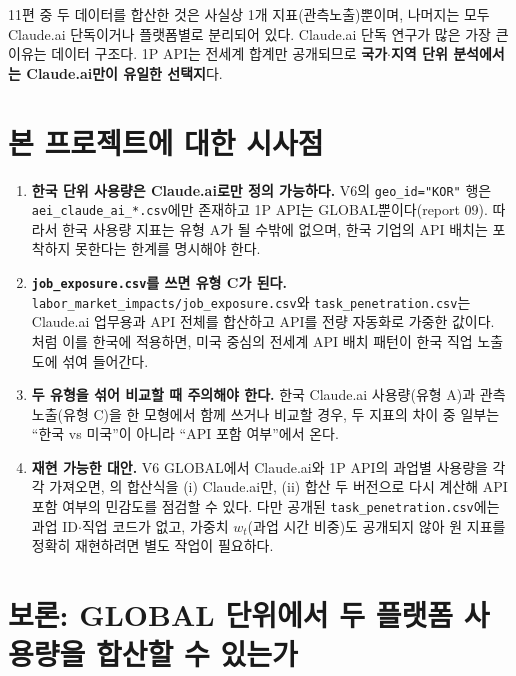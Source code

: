 \documentclass[11pt]{article}
\begin{document}
11편 중 두 데이터를 합산한 것은 사실상 1개 지표(관측노출)뿐이며, 나머지는 모두 Claude.ai 단독이거나 플랫폼별로 분리되어 있다. Claude.ai 단독 연구가 많은 가장 큰 이유는 데이터 구조다. 1P API는 전세계 합계만 공개되므로 \textbf{국가$\cdot$지역 단위 분석에서는 Claude.ai만이 유일한 선택지}다.

\section{본 프로젝트에 대한 시사점}

\begin{enumerate}[label=(\arabic*)]
  \item \textbf{한국 단위 사용량은 Claude.ai로만 정의 가능하다.} V6의 \texttt{geo\_id="KOR"} 행은 \texttt{aei\_claude\_ai\_*.csv}에만 존재하고 1P API는 GLOBAL뿐이다(report 09). 따라서 한국 사용량 지표는 유형 A가 될 수밖에 없으며, 한국 기업의 API 배치는 포착하지 못한다는 한계를 명시해야 한다.
  \item \textbf{\texttt{job\_exposure.csv}를 쓰면 유형 C가 된다.} \texttt{labor\_market\_impacts/job\_exposure.csv}와 \texttt{task\_penetration.csv}는 Claude.ai 업무용과 API 전체를 합산하고 API를 전량 자동화로 가중한 값이다. \textcite{kim-2026-generative-ai-korean-labor-market}처럼 이를 한국에 적용하면, 미국 중심의 전세계 API 배치 패턴이 한국 직업 노출도에 섞여 들어간다.
  \item \textbf{두 유형을 섞어 비교할 때 주의해야 한다.} 한국 Claude.ai 사용량(유형 A)과 관측노출(유형 C)을 한 모형에서 함께 쓰거나 비교할 경우, 두 지표의 차이 중 일부는 ``한국 vs 미국''이 아니라 ``API 포함 여부''에서 온다.
  \item \textbf{재현 가능한 대안.} V6 GLOBAL에서 Claude.ai와 1P API의 과업별 사용량을 각각 가져오면, \textcite{massenkoff-2026-labor-market-impacts-of-ai}의 합산식을 (i) Claude.ai만, (ii) 합산 두 버전으로 다시 계산해 API 포함 여부의 민감도를 점검할 수 있다. 다만 공개된 \texttt{task\_penetration.csv}에는 과업 ID$\cdot$직업 코드가 없고, 가중치 $w_t$(과업 시간 비중)도 공개되지 않아 원 지표를 정확히 재현하려면 별도 작업이 필요하다.
\end{enumerate}

\section{보론: GLOBAL 단위에서 두 플랫폼 사용량을 합산할 수 있는가}
\label{sec:globalsum}
\end{document}
